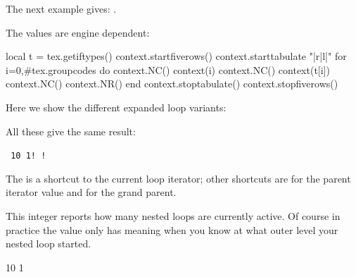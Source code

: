 \typebuffer

\stopoldprimitive

\startoldprimitive[title={\prm {currentiftype}}]

\startbuffer
[\the\currentiftype] \iftrue
    [\the\currentiftype]\iftrue
        [\the\currentiftype] \iftrue
            [\the\currentiftype]
        \fi [\the\currentiftype]
    \fi [\the\currentiftype]
\fi [\the\currentiftype]
\stopbuffer

The next example gives: \inlinebuffer.

\typebuffer

The values are engine dependent:

\startluacode
local t = tex.getiftypes()
context.startfiverows()
context.starttabulate { "|r|l|" }
for i=0,#tex.groupcodes do
    context.NC() context(i)
    context.NC() context(t[i])
    context.NC() context.NR()
end
context.stoptabulate()
context.stopfiverows()
\stopluacode

\stopoldprimitive

\startnewprimitive[title={\prm {currentloopiterator}}]

Here we show the different expanded loop variants:

\startbuffer
\edef\testA{\expandedloop  1 10 1{!}}
\edef\testB{\expandedrepeat  10  {!}}
\edef\testC{\expandedendless     {\ifnum\currentloopiterator>10 \quitloop\else !\fi}}
\edef\testD{\expandedendless     {\ifnum#I>10 \quitloop\else !\fi}}
\stopbuffer

\typebuffer \getbuffer

All these give the same result:

\startlines \tt
\meaningasis\testA
\meaningasis\testB
\meaningasis\testC
\meaningasis\testD
\stoplines

The  is a shortcut to the current loop iterator; other shortcuts are
 for the parent iterator value and  for the grand parent.

\stopnewprimitive

\startnewprimitive[title={\prm {currentloopnesting}}]

This integer reports how many nested loops are currently active. Of course in
practice the value only has meaning when you know at what outer level your nested
loop started.

\startbuffer
{} 10 1 {%
    \ifodd\currentloopiterator{}
    \fi
}
\stopbuffer


